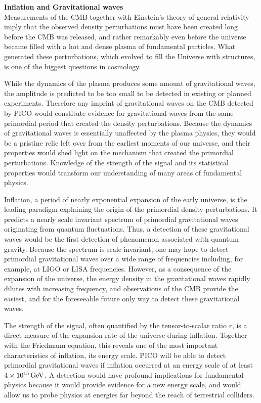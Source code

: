 \documentclass[PICOReport.tex]{subfiles}
\begin{document}
{\bf Inflation and Gravitational waves} \\ %
Measurements of the \ac{CMB} together with Einstein's theory of general relativity imply that the 
observed density perturbations must have been created long before the \ac{CMB} was released, 
and rather remarkably even before the universe became filled with a hot and dense plasma of 
fundamental particles. What generated these perturbations, 
which evolved to fill the Universe with structures, is one of the biggest questions in cosmology.

While the dynamics of the plasma produces some amount of gravitational waves, the amplitude 
is predicted to be too small to be detected in existing or planned experiments. 
Therefore any imprint of gravitational waves on the \ac{CMB} detected by PICO would constitute 
evidence for gravitational waves from the same primordial period that created the density perturbations. 
Because the dynamics of gravitational waves is essentially unaffected by the plasma physics, 
they would be a pristine relic left over from the earliest moments of our universe, and their properties 
would shed light on the mechanism that created the primordial perturbations. 
Knowledge of the strength of the 
signal and its statistical properties would transform our understanding of many areas of fundamental physics. 

Inflation, a period of nearly exponential expansion of the early universe, is the leading paradigm 
explaining the origin of the primordial density perturbations. It predicts a nearly scale invariant 
spectrum of primordial gravitational waves originating from quantum fluctuations. Thus, a detection 
of these gravitational waves would be the first detection of phenomenon associated with 
quantum gravity. Because the spectrum is scale-invariant, one may hope to detect primordial 
gravitational waves over a wide range of frequencies including, for example, at LIGO or LISA frequencies. 
However, as a consequence of the expansion of the universe, the energy density in the gravitational 
waves rapidly dilutes with increasing frequency, and observations of the CMB provide the easiest, 
and for the foreseeable future only way to detect these gravitational waves. 

The strength of the signal, often quantified by the tensor-to-scalar ratio $r$, is a direct measure of 
the expansion rate of the universe during inflation. Together with the Friedmann equation, this reveals 
one of the most important characteristics of inflation, its energy scale. PICO will be able to 
detect primordial gravitational waves if inflation occurred at an energy scale of at 
least $4\times 10^{15}\,\rm{GeV}$.  A detection would have profound implications for fundamental 
physics because it would provide evidence for a new energy scale, and would allow us to probe 
physics at energies far beyond the reach of terrestrial colliders.
\end{document}
